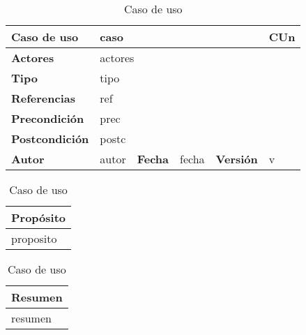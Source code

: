 \usepackage[table]{xcolor}


\begin{table}[H]
\centering
\begin{tabular}{|m{3cm}|m{4cm}|m{2cm}|m{2cm}|m{2cm}|m{1cm}|}
\hline
\textbf{Caso de uso} &  \multicolumn{4}{m{11cm}|}{caso} \vline &  \cellcolor{gray!40}CUn \\
\hline
\textbf{Actores} & \multicolumn{5}{m{11cm}|}{actores} \\
\hline
\textbf{Tipo} & \multicolumn{5}{m{11cm}|}{tipo} \\
\hline
\textbf{Referencias} &\multicolumn{5}{m{11cm}|}{ref} \\
\hline
\textbf{Precondición} & \multicolumn{5}{m{11cm}|}{prec} \\
\hline
\textbf{Postcondición} & \multicolumn{5}{m{11cm}|}{postc} \\
\hline
\textbf{Autor} & autor & \textbf{Fecha} & fecha & \textbf{Versión} & v \\
\hline
\end{tabular}

\vspace{1cm}

\begin{tabular}{|m{16.2cm}|}
\hline
\textbf{Propósito} \\
\hline
proposito \\
\hline
\end{tabular}

\vspace{1cm}

\begin{tabular}{|m{16.2cm}|}
\hline
\textbf{Resumen} \\
\hline
resumen \\
\hline
\end{tabular}

\caption{Caso de uso}

\end{table}